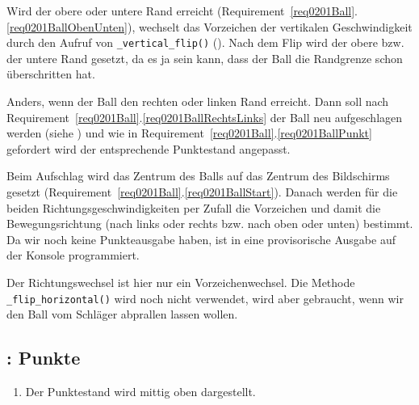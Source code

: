 Wird der obere oder untere Rand erreicht (Requirement~\ref{req0201Ball}.\ref{req0201BallObenUnten}), wechselt das Vorzeichen der vertikalen Geschwindigkeit durch den Aufruf von \texttt{\_vertical\_flip()} (). Nach dem Flip wird der obere bzw. der untere Rand gesetzt, da es ja sein kann, dass der Ball die Randgrenze schon überschritten hat. 

Anders, wenn der Ball den rechten oder linken Rand erreicht. Dann soll nach Requirement~\ref{req0201Ball}.\ref{req0201BallRechtsLinks} der Ball neu aufgeschlagen werden (siehe ) und wie in Requirement~\ref{req0201Ball}.\ref{req0201BallPunkt} gefordert wird der entsprechende Punktestand angepasst. 


Beim Aufschlag wird das Zentrum des Balls auf das Zentrum des Bildschirms gesetzt (Requirement~\ref{req0201Ball}.\ref{req0201BallStart}). Danach werden für die beiden Richtungsgeschwindigkeiten per Zufall die Vorzeichen und damit die Bewegungsrichtung (nach links oder rechts bzw. nach oben oder unten) bestimmt. Da wir noch keine Punkteausgabe haben, ist in  eine provisorische Ausgabe auf der Konsole programmiert.


Der Richtungswechsel ist hier nur ein Vorzeichenwechsel. Die Methode \texttt{\_flip\_hori\-zon\-tal()} wird noch nicht verwendet, wird aber gebraucht, wenn wir den Ball vom Schläger abprallen lassen wollen. 


\subsection{: Punkte}

\begin{enumerate}
	\item Der Punktestand wird mittig oben dargestellt.\label{req0201PunkteOben}
\end{enumerate}
\er

